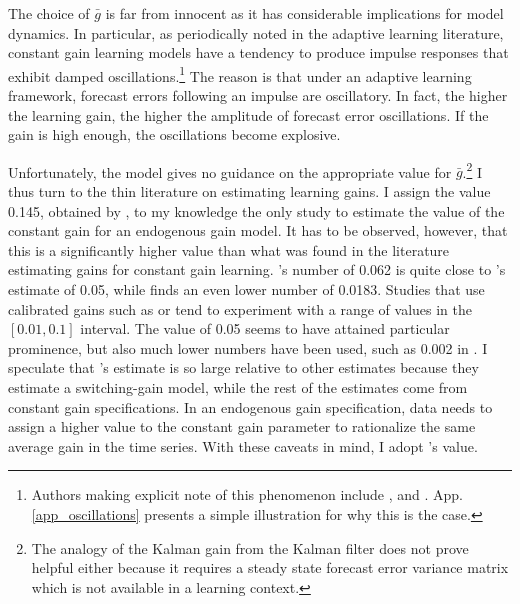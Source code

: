 \documentclass[11pt]{article}
\renewcommand{\[}{\begin{equation}}
\renewcommand{\]}{\end{equation}}
\begin{document}
The choice of $\bar{g}$ is far from innocent as it has considerable implications for model dynamics. In particular, as periodically noted in the adaptive learning literature, constant gain learning models have a tendency to produce impulse responses that exhibit damped oscillations.\footnote{Authors making explicit note of this phenomenon include \cite{evans_honkapohja2001}, \cite{evans2013bayesian} and \cite{anufriev2012evolutionary}. App. \ref{app_oscillations} presents a simple illustration for why this is the case.} The reason is that under an adaptive learning framework, forecast errors following an impulse are oscillatory. In fact, the higher the learning gain, the higher the amplitude of forecast error oscillations. If the gain is high enough, the oscillations become explosive. 

Unfortunately, the model gives no guidance on the appropriate value for $\bar{g}$.\footnote{The analogy of the Kalman gain from the Kalman filter does not prove helpful either because it requires a steady state forecast error variance matrix which is not available in a learning context.} I thus turn to the thin literature on estimating learning gains. I assign the value  0.145, obtained by \cite{carvalho2019anchored}, to my knowledge the only study to estimate the value of the constant gain for an endogenous gain model. It has to be observed, however, that this is a significantly higher value than what was found in the literature estimating gains for constant gain learning. \cite{branch2006simple}'s number of 0.062 is quite close to \cite{eusepi2018limits}'s estimate of 0.05, while \cite{milani2007expectations} finds an even lower number of 0.0183. Studies that use calibrated gains such as \cite{williams2003adaptive} or \cite{orphanides2005decline} tend to experiment with a range of values in the $[0.01,0.1]$ interval. The value of 0.05 seems to have attained particular prominence, but also much lower numbers have been used, such as 0.002 in \cite{eusepi2011expectations}. I speculate that \cite{carvalho2019anchored}'s estimate is so large relative to other estimates because they estimate a switching-gain model, while the rest of the estimates come from constant gain specifications. In an endogenous gain specification, data needs to assign a higher value to the constant gain parameter to rationalize the same average gain in the time series. With these caveats in mind, I adopt \cite{carvalho2019anchored}'s value.
\end{document}
